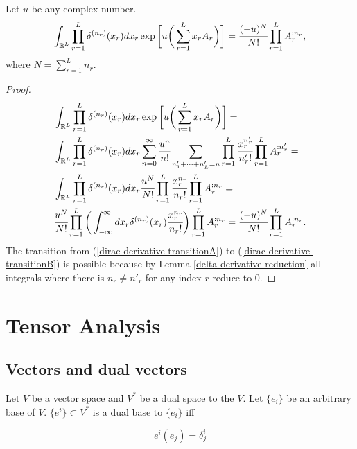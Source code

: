 \documentclass[main.tex]{subfiles}
\begin{document}
\begin{lemma}
\label{lemma-for-weyl-transform}
Let $u$ be any complex number.
\begin{equation}
\int_{\mathbb{R}^L} \prod_{r=1}^L \delta^{(n_r)}(x_r) dx_r \exp\bigg[ u\bigg( \sum_{r=1}^L x_r A_r \bigg)\bigg] = \cfrac{(-u)^N}{N!} \prod_{r=1}^L A_r^{:n_r},
\end{equation}
where $N = \sum_{r=1}^L n_r$.
\end{lemma}
\begin{proof}
\begin{align}
& \int_{\mathbb{R}^L} \prod_{r=1}^L \delta^{(n_r)}(x_r) dx_r \exp\bigg[ u\bigg( \sum_{r=1}^L x_r A_r \bigg)\bigg] = \\
\label{dirac-derivative-transitionA}
& \int_{\mathbb{R}^L} \prod_{r=1}^L \delta^{(n_r)}(x_r) dx_r \sum_{n=0}^\infty \cfrac{u^n}{n!}
\sum_{n'_1 + \cdots + n'_L = n} \prod_{r=1}^L \cfrac{x_{r}^{n'_{r}}}{n'_{r}!} \prod_{r=1}^L A_{r}^{:n'_{r}} = \\
\label{dirac-derivative-transitionB}
& \int_{\mathbb{R}^L} \prod_{r=1}^L \delta^{(n_r)}(x_r) dx_r \cfrac{u^N}{N!}
\prod_{r=1}^L \cfrac{x_{r}^{n_{r}}}{n_{r}!} \prod_{r=1}^L A_{r}^{:n_{r}} = \\
& \cfrac{u^N}{N!} \prod_{r=1}^L \bigg( \int_{-\infty}^\infty dx_r 
\delta^{(n_r)}(x_r) \cfrac{x_r^{n_r}}{n_r!}\bigg)
\prod_{r=1}^L A_{r}^{:n_{r}} = \cfrac{(-u)^N}{N!} \prod_{r=1}^L A_r^{:n_r}.
\end{align}
The transition from (\ref{dirac-derivative-transitionA}) to (\ref{dirac-derivative-transitionB}) is possible because by Lemma \ref{delta-derivative-reduction} all integrals where there is $n_r \not= n'_{r}$ for any index $r$ reduce to $0$.
\end{proof} 

\section{Tensor Analysis}
\subsection{Vectors and dual vectors}

Let $V$ be a vector space and $V^*$ be a dual space to the $V$. Let $\{e_i\}$ be an arbitrary base of $V$. $\{e^i\}\subset V^*$ is a dual base to $\{e_i\}$ iff

\begin{equation}
\boxed{e^i(e_j) = \delta^i_j}
\end{equation}
\end{document}
